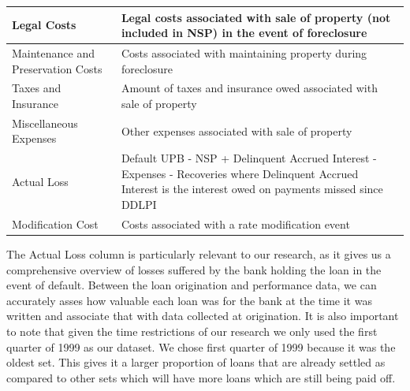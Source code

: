 \documentclass[12 pt]{uncw_thesis}
\theoremstyle{plain}
\theoremstyle{remark}
\theoremstyle{definition}
\begin{document}
\begin{center}
\begin{longtable}{ |M{6cm}|M{8cm}| }
		\hline
		Legal Costs & Legal costs associated with sale of property (not included in NSP) in the event of foreclosure\\
		\hline
		Maintenance and Preservation Costs & Costs associated with maintaining property during foreclosure\\
		\hline
		Taxes and Insurance & Amount of taxes and insurance owed associated with sale of property\\
		\hline
		Miscellaneous Expenses & Other expenses associated with sale of property \\
		\hline
		Actual Loss & Default UPB - NSP + Delinquent Accrued Interest - Expenses - Recoveries where Delinquent Accrued Interest is the interest owed on payments missed since DDLPI\\
		\hline
		Modification Cost & Costs associated with a rate modification event\\
		\hline
	\end{longtable}
\end{center}
The Actual Loss column is particularly relevant to our research, as it gives us a comprehensive overview of losses suffered by the bank holding the loan in the event of default. Between the loan origination and performance data, we can accurately asses how valuable each loan was for the bank at the time it was written and associate that with data collected at origination. It is also important to note that given the time restrictions of our research we only used the first quarter of 1999 as our dataset. We chose first quarter of 1999 because it was the oldest set. This gives it a larger proportion of loans that are already settled as compared to other sets which will have more loans which are still being paid off.
\end{document}
